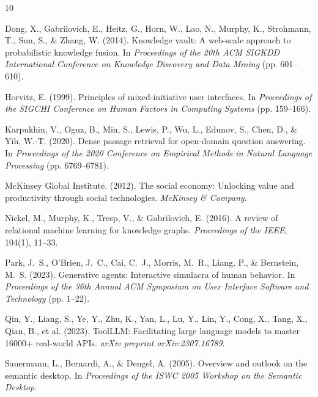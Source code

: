 \documentclass[11pt,a4paper]{article}
\begin{document}

\begin{thebibliography}{10}

Dong, X., Gabrilovich, E., Heitz, G., Horn, W., Lao, N., Murphy, K., Strohmann, T., Sun, S., \& Zhang, W. (2014).
\newblock Knowledge vault: A web-scale approach to probabilistic knowledge fusion.
\newblock In \emph{Proceedings of the 20th ACM SIGKDD International Conference on Knowledge Discovery and Data Mining} (pp. 601--610).

Horvitz, E. (1999).
\newblock Principles of mixed-initiative user interfaces.
\newblock In \emph{Proceedings of the SIGCHI Conference on Human Factors in Computing Systems} (pp. 159--166).

Karpukhin, V., Oguz, B., Min, S., Lewis, P., Wu, L., Edunov, S., Chen, D., \& Yih, W.-T. (2020).
\newblock Dense passage retrieval for open-domain question answering.
\newblock In \emph{Proceedings of the 2020 Conference on Empirical Methods in Natural Language Processing} (pp. 6769--6781).

McKinsey Global Institute. (2012).
\newblock The social economy: Unlocking value and productivity through social technologies.
\newblock \emph{McKinsey \& Company}.

Nickel, M., Murphy, K., Tresp, V., \& Gabrilovich, E. (2016).
\newblock A review of relational machine learning for knowledge graphs.
\newblock \emph{Proceedings of the IEEE}, 104(1), 11--33.

Park, J.~S., O'Brien, J.~C., Cai, C.~J., Morris, M.~R., Liang, P., \& Bernstein, M.~S. (2023).
\newblock Generative agents: Interactive simulacra of human behavior.
\newblock In \emph{Proceedings of the 36th Annual ACM Symposium on User Interface Software and Technology} (pp. 1--22).

Qin, Y., Liang, S., Ye, Y., Zhu, K., Yan, L., Lu, Y., Lin, Y., Cong, X., Tang, X., Qian, B., et al. (2023).
\newblock ToolLLM: Facilitating large language models to master 16000+ real-world APIs.
\newblock \emph{arXiv preprint arXiv:2307.16789}.

Sauermann, L., Bernardi, A., \& Dengel, A. (2005).
\newblock Overview and outlook on the semantic desktop.
\newblock In \emph{Proceedings of the ISWC 2005 Workshop on the Semantic Desktop}.


\end{thebibliography}
\end{document}
